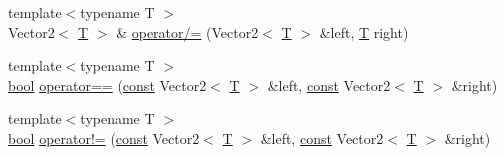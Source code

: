 \begin{DoxyCompactItemize}
\item 
{\footnotesize template$<$typename T $>$ }\\Vector2$<$ \hyperlink{curses_8priv_8h_a5ef253115820acf7d27f3c5c3b02a0f0}{T} $>$ \& \hyperlink{lapin_2dep_2_s_f_m_l-2_83_2include_2_s_f_m_l_2_system_2_vector2_8inl_ad2184b7a2f3e06a149072232f916cd16}{operator/=} (Vector2$<$ \hyperlink{curses_8priv_8h_a5ef253115820acf7d27f3c5c3b02a0f0}{T} $>$ \&left, \hyperlink{curses_8priv_8h_a5ef253115820acf7d27f3c5c3b02a0f0}{T} right)
\item 
{\footnotesize template$<$typename T $>$ }\\\hyperlink{term__entry_8h_a002004ba5d663f149f6c38064926abac}{bool} \hyperlink{lapin_2dep_2_s_f_m_l-2_83_2include_2_s_f_m_l_2_system_2_vector2_8inl_a9a7b2d36c3850828fdb651facfd25136}{operator==} (\hyperlink{term__entry_8h_a57bd63ce7f9a353488880e3de6692d5a}{const} Vector2$<$ \hyperlink{curses_8priv_8h_a5ef253115820acf7d27f3c5c3b02a0f0}{T} $>$ \&left, \hyperlink{term__entry_8h_a57bd63ce7f9a353488880e3de6692d5a}{const} Vector2$<$ \hyperlink{curses_8priv_8h_a5ef253115820acf7d27f3c5c3b02a0f0}{T} $>$ \&right)
\item 
{\footnotesize template$<$typename T $>$ }\\\hyperlink{term__entry_8h_a002004ba5d663f149f6c38064926abac}{bool} \hyperlink{lapin_2dep_2_s_f_m_l-2_83_2include_2_s_f_m_l_2_system_2_vector2_8inl_a01673da35ef9c52d0e54b8263549a956}{operator!=} (\hyperlink{term__entry_8h_a57bd63ce7f9a353488880e3de6692d5a}{const} Vector2$<$ \hyperlink{curses_8priv_8h_a5ef253115820acf7d27f3c5c3b02a0f0}{T} $>$ \&left, \hyperlink{term__entry_8h_a57bd63ce7f9a353488880e3de6692d5a}{const} Vector2$<$ \hyperlink{curses_8priv_8h_a5ef253115820acf7d27f3c5c3b02a0f0}{T} $>$ \&right)
\end{DoxyCompactItemize}


